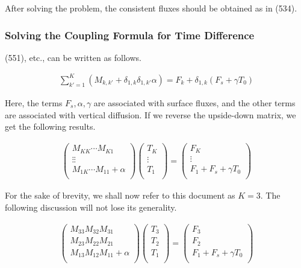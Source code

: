 After solving the problem, the consistent fluxes should be obtained as
in (534).

\hypertarget{solving-the-coupling-formula-for-time-difference}{%
\subsubsection{Solving the Coupling Formula for Time
Difference}\label{solving-the-coupling-formula-for-time-difference}}

(551), etc., can be written as follows.

\begin{eqnarray}
  \sum_{k'=1}^{K} ( M_{k,k'} + \delta_{1,k} \delta_{1,k'} \alpha)
    = F_k + \delta_{1,k} ( F_s + \gamma T_0 )
\end{eqnarray}

Here, the terms \(F_s, \alpha, \gamma\) are associated with surface
fluxes, and the other terms are associated with vertical diffusion. If
we reverse the upside-down matrix, we get the following results.

\begin{eqnarray}
  \left( \begin{array}{lll} M_{KK}  \cdots  M_{K1} \\ \vdots
  \vdots \\ M_{1K}  \cdots  M_{11} + \alpha \\
\end{array}  \right)
\left( \begin{array}{l} T_K \\ \vdots \\ T_1 \\
\end{array}  \right)
= \left( \begin{array}{l} F_K \\ \vdots \\ F_1 + F_s + \gamma T_{0} \\
\end{array} \right)
\end{eqnarray}

For the sake of brevity, we shall now refer to this document as \(K=3\).
The following discussion will not lose its generality.

\begin{eqnarray}
  \left( \begin{array}{lll} M_{33}  M_{32}  M_{31} \\ M_{23}
  M_{22}  M_{21} \\ M_{13}  M_{12}  M_{11} + \alpha \\
\end{array} \right)
\left( \begin{array}{l} T_3 \\ T_2 \\ T_1 \\
\end{array} \right)
= \left( \begin{array}{l} F_3 \\ F_2 \\ F_1 + F_s + \gamma T_{0} \\
\end{array} \right)
\end{eqnarray}

